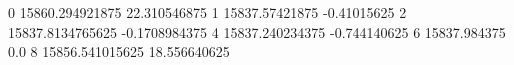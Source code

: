 0 15860.294921875 22.310546875
1 15837.57421875 -0.41015625
2 15837.8134765625 -0.1708984375
4 15837.240234375 -0.744140625
6 15837.984375 0.0
8 15856.541015625 18.556640625
